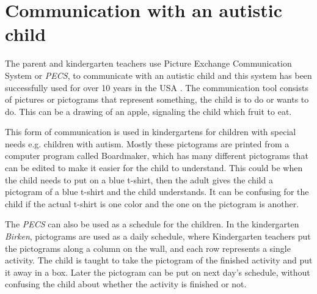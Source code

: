 \section{Communication with an autistic child}
The parent and kindergarten teachers use Picture Exchange Communication System or \emph{PECS}, to communicate with an autistic child and this system has been successfully used for over 10 years in the USA \cite{centerAutism}. The communication tool consists of pictures or pictograms that represent something, the child is to do or wants to do. This can be a drawing of an apple, signaling the child which fruit to eat. 

This form of communication is used in kindergartens for children with special needs e.g. children with autism. Mostly these pictograms are printed from a computer program called Boardmaker, which has many different pictograms that can be edited to make it easier for the child to understand\cite{centerAutism}. This could be when the child needs to put on a blue t-shirt, then the adult gives the child a pictogram of a blue t-shirt and the child understands. It can be confusing for the child if the actual t-shirt is one color and the one on the pictogram is another.

The \emph{PECS} can also be used as a schedule for the children. In the kindergarten \emph{Birken}, pictograms are used as a daily schedule, where Kindergarten teachers put the pictograms along a column on the wall, and each row represents a single activity.
The child is taught to take the pictogram of the finished activity and put it away in a box. Later the pictogram can be put on next day's schedule, without confusing the child about whether the activity is finished or not.
